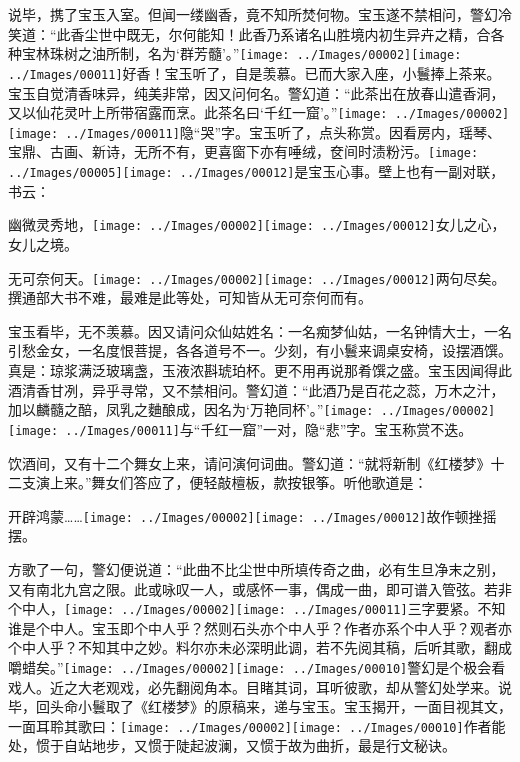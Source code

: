 说毕，携了宝玉入室。但闻一缕幽香，竟不知所焚何物。宝玉遂不禁相问，警幻冷笑道：``此香尘世中既无，尔何能知！此香乃系诸名山胜境内初生异卉之精，合各种宝林珠树之油所制，名为`群芳髓'。''{\texttt{[image: ../Images/00002]}\texttt{[image: ../Images/00011]}\footnotesize \kaishu 好香！}宝玉听了，自是羡慕。已而大家入座，小鬟捧上茶来。宝玉自觉清香味异，纯美非常，因又问何名。警幻道：``此茶出在放春山遣香洞，又以仙花灵叶上所带宿露而烹。此茶名曰`千红一窟'。''{\texttt{[image: ../Images/00002]}\texttt{[image: ../Images/00011]}\footnotesize \kaishu 隐``哭''字。}宝玉听了，点头称赏。因看房内，瑶琴、宝鼎、古画、新诗，无所不有，更喜窗下亦有唾绒，奁间时渍粉污。{\texttt{[image: ../Images/00005]}\texttt{[image: ../Images/00012]}\footnotesize \kaishu 是宝玉心事。}壁上也有一副对联，书云：

幽微灵秀地，{\texttt{[image: ../Images/00002]}\texttt{[image: ../Images/00012]}\footnotesize \kaishu 女儿之心，女儿之境。}

无可奈何天。{\texttt{[image: ../Images/00002]}\texttt{[image: ../Images/00012]}\footnotesize \kaishu 两句尽矣。撰通部大书不难，最难是此等处，可知皆从无可奈何而有。}

宝玉看毕，无不羡慕。因又请问众仙姑姓名：一名痴梦仙姑，一名钟情大士，一名引愁金女，一名度恨菩提，各各道号不一。少刻，有小鬟来调桌安椅，设摆酒馔。真是：琼浆满泛玻璃盏，玉液浓斟琥珀杯。更不用再说那肴馔之盛。宝玉因闻得此酒清香甘冽，异乎寻常，又不禁相问。警幻道：``此酒乃是百花之蕊，万木之汁，加以麟髓之醅，凤乳之麯酿成，因名为`万艳同杯'。''{\texttt{[image: ../Images/00002]}\texttt{[image: ../Images/00011]}\footnotesize \kaishu 与``千红一窟''一对，隐``悲''字。}宝玉称赏不迭。

饮酒间，又有十二个舞女上来，请问演何词曲。警幻道：``就将新制《红楼梦》十二支演上来。''舞女们答应了，便轻敲檀板，款按银筝。听他歌道是：

开辟鸿蒙\ldots{}\ldots{}{\texttt{[image: ../Images/00002]}\texttt{[image: ../Images/00012]}\footnotesize \kaishu 故作顿挫摇摆。}

方歌了一句，警幻便说道：``此曲不比尘世中所填传奇之曲，必有生旦净末之别，又有南北九宫之限。此或咏叹一人，或感怀一事，偶成一曲，即可谱入管弦。若非个中人，{\texttt{[image: ../Images/00002]}\texttt{[image: ../Images/00011]}\footnotesize \kaishu 三字要紧。不知谁是个中人。宝玉即个中人乎？然则石头亦个中人乎？作者亦系个中人乎？观者亦个中人乎？}不知其中之妙。料尔亦未必深明此调，若不先阅其稿，后听其歌，翻成嚼蜡矣。''{\texttt{[image: ../Images/00002]}\texttt{[image: ../Images/00010]}\footnotesize \kaishu 警幻是个极会看戏人。近之大老观戏，必先翻阅角本。目睹其词，耳听彼歌，却从警幻处学来。}说毕，回头命小鬟取了《红楼梦》的原稿来，递与宝玉。宝玉揭开，一面目视其文，一面耳聆其歌曰：{\texttt{[image: ../Images/00002]}\texttt{[image: ../Images/00010]}\footnotesize \kaishu 作者能处，惯于自站地步，又惯于陡起波澜，又惯于故为曲折，最是行文秘诀。}

